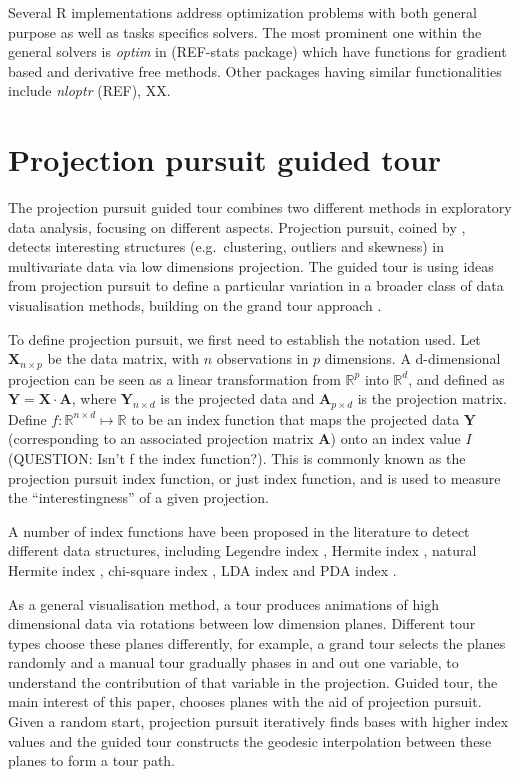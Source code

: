 Several R implementations address optimization problems with both general purpose as well as tasks specifics solvers. The most prominent one within the general solvers is \emph{optim} in (REF-stats package) which have functions for gradient based and derivative free methods. Other packages having similar functionalities include \emph{nloptr} (REF), XX.

\hypertarget{tour}{%
\section{Projection pursuit guided tour}\label{tour}}

The projection pursuit guided tour combines two different methods in exploratory data analysis, focusing on different aspects. Projection pursuit, coined by \citet{friedman1974projection}, detects interesting structures (e.g.~clustering, outliers and skewness) in multivariate data via low dimensions projection. The guided tour is using ideas from projection pursuit to define a particular variation in a broader class of data visualisation methods, building on the grand tour approach \citep{As85}.

To define projection pursuit, we first need to establish the notation used. Let \(\mathbf{X}_{n \times p}\) be the data matrix, with \(n\) observations in \(p\) dimensions. A d-dimensional projection can be seen as a linear transformation from \(\mathbb{R}^p\) into \(\mathbb{R}^d\), and defined as \(\mathbf{Y} = \mathbf{X} \cdot \mathbf{A}\), where \(\mathbf{Y}_{n \times d}\) is the projected data and \(\mathbf{A}_{p\times d}\) is the projection matrix. Define \(f: \mathbb{R}^{n \times d} \mapsto \mathbb{R}\) to be an index function that maps the projected data \(\mathbf{Y}\) (corresponding to an associated projection matrix \(\mathbf{A}\)) onto an index value \(I\) (QUESTION: Isn't f the index function?). This is commonly known as the projection pursuit index function, or just index function, and is used to measure the ``interestingness'' of a given projection.

A number of index functions have been proposed in the literature to detect different data structures, including Legendre index \citep{friedman1974projection}, Hermite index \citep{hall1989polynomial}, natural Hermite index \citep{cook1993projection}, chi-square index \citep{posse1995projection}, LDA index \citep{lee2005projection} and PDA index \citep{lee2010projection}.

As a general visualisation method, a tour produces animations of high dimensional data via rotations between low dimension planes. Different tour types choose these planes differently, for example, a grand tour \citep{cook2008grand} selects the planes randomly and a manual tour \citep{cook1997manual} gradually phases in and out one variable, to understand the contribution of that variable in the projection. Guided tour, the main interest of this paper, chooses planes with the aid of projection pursuit. Given a random start, projection pursuit iteratively finds bases with higher index values and the guided tour constructs the geodesic interpolation between these planes to form a tour path.

